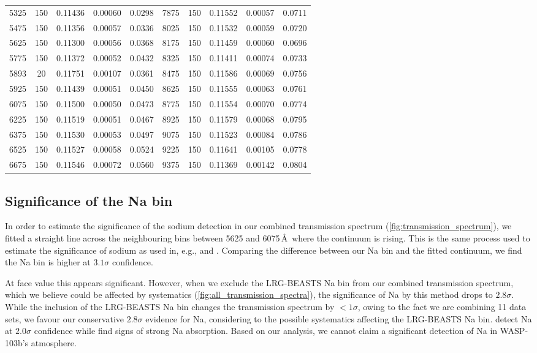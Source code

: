 \documentclass[twocolumn]{aastex63}
\begin{document}
\begin{table*}
\begin{tabular}{ccccc|ccccc}
 5325 &    150 &  0.11436 &  0.00060  & 0.0298 & 7875 &    150 &  0.11552 &  0.00057  & 0.0711 \\
 5475 &    150 &  0.11356 &  0.00057  & 0.0336 & 8025 &    150 &  0.11532 &  0.00059  & 0.0720 \\
 5625 &    150 &  0.11300 &  0.00056  & 0.0368 & 8175 &    150 &  0.11459 &  0.00060  & 0.0696 \\
 5775 &    150 &  0.11372 &  0.00052  & 0.0432 & 8325 &    150 &  0.11411 &  0.00074  & 0.0733 \\
 5893 &     20 &  0.11751 &  0.00107  & 0.0361 & 8475 &    150 &  0.11586 &  0.00069  & 0.0756 \\
 5925 &    150 &  0.11439 &  0.00051  & 0.0450 & 8625 &    150 &  0.11555 &  0.00063  & 0.0761 \\
 6075 &    150 &  0.11500 &  0.00050  & 0.0473 & 8775 &    150 &  0.11554 &  0.00070  & 0.0774 \\
 6225 &    150 &  0.11519 &  0.00051  & 0.0467 & 8925 &    150 &  0.11579 &  0.00068  & 0.0795 \\
 6375 &    150 &  0.11530 &  0.00053  & 0.0497 & 9075 &    150 &  0.11523 &  0.00084  & 0.0786 \\
 6525 &    150 &  0.11527 &  0.00058  & 0.0524 & 9225 &    150 &  0.11641 &  0.00105  & 0.0778 \\
 6675 &    150 &  0.11546 &  0.00072  & 0.0560 & 9375 &    150 &  0.11369 &  0.00142  & 0.0804 \\
 \hline
\bottomrule
\end{tabular}
\end{table*}


\subsection{Significance of the Na bin}
\label{sec:Na}

In order to estimate the significance of the sodium detection in our combined transmission spectrum (\autoref{fig:transmission_spectrum}), we fitted a straight line across the neighbouring bins between 5625 and 6075\,\AA\ where the continuum is rising. This is the same process used to estimate the significance of sodium as used in, e.g., \cite{Nikolov2016,Carter2020} and \cite{Alderson2020}.  Comparing the difference between our Na bin and the fitted continuum, we find the Na bin is higher at $3.1\sigma$ confidence.

At face value this appears significant. However, when we exclude the LRG-BEASTS Na bin from our combined transmission spectrum, which we believe could be affected by systematics (\autoref{fig:all_transmission_spectra}), the significance of Na by this method drops to $2.8\sigma$. While the inclusion of the LRG-BEASTS Na bin changes the transmission spectrum by $< 1\sigma$, owing to the fact we are combining 11 data sets, we favour our conservative $2.8\sigma$ evidence for Na, considering to the possible systematics affecting the LRG-BEASTS Na bin. \cite{Wilson2020} detect Na at $2.0\sigma$ confidence while \cite{Lendl2017} find signs of strong Na absorption. Based on our analysis, we cannot claim a significant detection of Na in WASP-103b's atmosphere.
\end{document}
